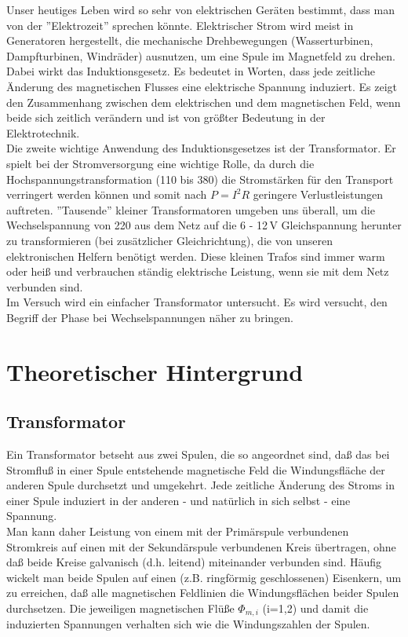 Unser heutiges Leben wird so sehr von elektrischen Geräten bestimmt, dass man von der ''Elektrozeit'' sprechen könnte. Elektrischer Strom wird meist in Generatoren hergestellt, die mechanische Drehbewegungen (Wasserturbinen, Dampfturbinen, Windräder) ausnutzen, um eine Spule im Magnetfeld zu drehen. Dabei wirkt das Induktionsgesetz. Es bedeutet in Worten, dass jede zeitliche Änderung des magnetischen Flusses eine elektrische Spannung induziert. Es zeigt den Zusammenhang zwischen dem elektrischen und dem magnetischen Feld, wenn beide sich zeitlich verändern und ist von größter Bedeutung in der Elektrotechnik.\\
Die zweite wichtige Anwendung des Induktionsgesetzes ist der Transformator. Er spielt bei der Stromversorgung eine wichtige Rolle, da durch die Hochspannungstransformation (\unit{110}{\kilo}{\volt} bis \unit{380}{\kilo}{\volt}) die Stromstärken für den Transport verringert werden können und somit nach $P = I^2 R$ geringere Verlustleistungen auftreten. ''Tausende'' kleiner Transformatoren umgeben uns überall, um die Wechselspannung von \unit{220}{\volt} aus dem Netz auf die 6 - 12\,V Gleichspannung herunter zu transformieren (bei zusätzlicher Gleichrichtung), die von unseren elektronischen Helfern benötigt werden. Diese kleinen Trafos sind immer warm oder heiß und verbrauchen ständig elektrische Leistung, wenn sie mit dem Netz verbunden sind.\\
Im Versuch wird ein einfacher Transformator untersucht. Es wird versucht, den Begriff der Phase bei Wechselspannungen näher zu bringen.

\section{Theoretischer Hintergrund}


\subsection{Transformator}

Ein Transformator betseht aus zwei Spulen, die so angeordnet sind, daß das bei Stromfluß in einer Spule entstehende magnetische Feld die Windungsfläche der anderen Spule durchsetzt und umgekehrt. Jede zeitliche Änderung des Stroms in einer Spule induziert in der anderen - und natürlich in sich selbst - eine Spannung.\\
Man kann daher Leistung von einem mit der Primärspule verbundenen Stromkreis auf einen mit der Sekundärspule verbundenen Kreis übertragen, ohne daß beide Kreise galvanisch (d.h. leitend) miteinander verbunden sind. Häufig wickelt man beide Spulen auf einen (z.B. ringförmig geschlossenen) Eisenkern, um zu erreichen, daß alle magnetischen Feldlinien die Windungsflächen beider Spulen durchsetzen. Die jeweiligen magnetischen Flüße $\Phi_{m,i}$ (i=1,2) und damit die induzierten Spannungen verhalten sich wie die Windungszahlen der Spulen. \\

